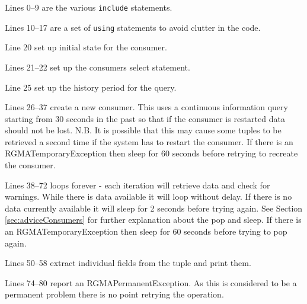 

Lines 0--9 are the various \texttt{include} statements.

Lines 10--17 are a set of \texttt{using} statements to avoid clutter
in the code.

Line 20 set up initial state for the consumer.

Lines 21--22 set up the consumers select statement.

Line 25 set up the history period for the query.

Lines 26--37 create a new consumer. This uses a continuous information
query starting from 30 seconds in the past so that if the consumer is
restarted data should not be lost. N.B. It is possible that this may
cause some tuples to be retrieved a second time if the system has to
restart the consumer. If there is an RGMATemporaryException then sleep
for 60 seconds before retrying to recreate the consumer.

Lines 38--72 loops forever - each iteration will retrieve data and
check for warnings. While there is data available it will loop without
delay. If there is no data currently available it will sleep for 2
seconds before trying again. See Section \ref{sec:adviceConsumers} for further explanation about the pop and sleep. If
there is an RGMATemporaryException then sleep for 60 seconds before
trying to pop again.

Lines 50--58 extract individual fields from the tuple and print them.

Lines 74--80 report an RGMAPermanentException. As this is considered
to be a permanent problem there is no point retrying the operation.

